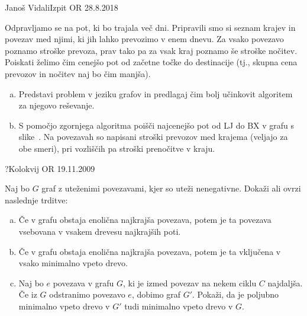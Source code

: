 \begin{naloga}{Janoš Vidali}{Izpit OR 28.8.2018}
\begin{vprasanje}[pot]
Odpravljamo se na pot, ki bo trajala več dni.
Pripravili smo si seznam krajev in povezav med njimi,
ki jih lahko prevozimo v enem dnevu.
Za vsako povezavo poznamo stroške prevoza,
prav tako pa za vsak kraj poznamo še stroške nočitev.
Poiskati želimo čim cenejšo pot od začetne točke do destinacije
(tj., skupna cena prevozov in nočitev naj bo čim manjša).

\begin{enumerate}[(a)]
\item Predstavi problem v jeziku grafov
in predlagaj čim bolj učinkovit algoritem za njegovo reševanje.

\item S pomočjo zgornjega algoritma poišči najcenejšo pot od LJ do BX
v grafu s slike~.
Na povezavah so napisani stroški prevozov med krajema
(veljajo za obe smeri),
pri vozliščih pa stroški prenočitve v kraju.
\end{enumerate}
\end{vprasanje}
\begin{odgovor}
\end{odgovor}
\end{naloga}


\begin{naloga}{?}{Kolokvij OR 19.11.2009}
\begin{vprasanje}
Naj bo $G$ graf z uteženimi povezavami, kjer so uteži nenegativne.
Dokaži ali ovrzi naslednje trditve:
\begin{enumerate}[(a)]
\item Če v grafu obstaja enolična najkrajša povezava,
potem je ta povezava vsebovana v vsakem drevesu najkrajših poti.
\item Če v grafu obstaja enolična najkrajša povezava,
potem je ta vključena v vsako minimalno vpeto drevo.
\item Naj bo $e$ povezava v grafu $G$,
ki je izmed povezav na nekem ciklu $C$ najdaljša.
Če iz $G$ odstranimo povezavo $e$, dobimo graf $G'$.
Pokaži, da je poljubno minimalno vpeto drevo v $G'$
tudi minimalno vpeto drevo v $G$.
\end{enumerate}
\end{vprasanje}
\begin{odgovor}
\end{odgovor}
\end{naloga}


